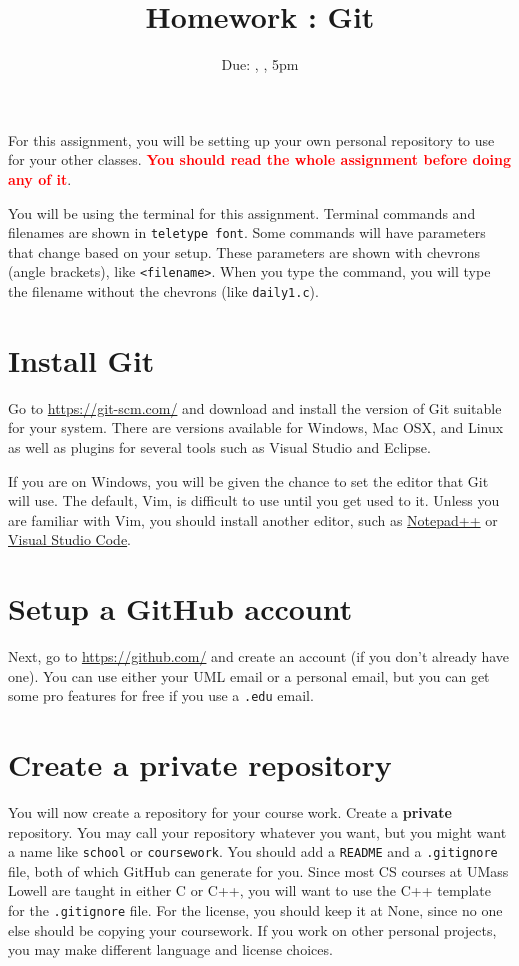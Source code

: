 \documentclass[12pt]{article}
\title{Homework \hwno: Git}
\date{Due: \dayofweekname{\duedate}{\duemonth}{\year}, \monthname[\duemonth] \duedate, 5pm}
\newcommand{\code}[1]{\texttt{#1}}
\begin{document}
\maketitle

For this assignment, you will be setting up your own personal repository to use for your other classes.  
\textcolor{red}{\textbf{You should read the whole assignment before doing any of it}}.

You will be using the terminal for this assignment.
Terminal commands and filenames are shown in \texttt{teletype font}.
Some commands will have parameters that change based on your setup.
These parameters are shown with chevrons (angle brackets), like \texttt{<filename>}.
When you type the command, you will type the filename without the chevrons (like \texttt{daily1.c}).

\section{Install Git}\label{sec:Install}

Go to \url{https://git-scm.com/} and download and install the version of Git suitable for your system.
There are versions available for Windows, Mac OSX, and Linux as well as plugins for several tools such as Visual Studio and Eclipse.

If you are on Windows, you will be given the chance to set the editor that Git will use.
The default, Vim, is difficult to use until you get used to it.
Unless you are familiar with Vim, you should install another editor, such as \href{https://notepad-plus-plus.org/}{Notepad++} or \href{https://code.visualstudio.com/}{Visual Studio Code}.

\section{Setup a GitHub account}
Next, go to \url{https://github.com/} and create an account (if you don't already have one).
You can use either your UML email or a personal email, but you can get some pro features for free if you use a \texttt{.edu} email.

\section{Create a private repository}

You will now create a repository for your course work.
Create a \textbf{private} repository.
You may call your repository whatever you want, but you might want a name like \code{school} or \code{coursework}.
You should add a \code{README} and a \code{.gitignore} file, both of which GitHub can generate for you.
Since most CS courses at UMass Lowell are taught in either C or C++, you will want to use the C++ template for the \code{.gitignore} file.
For the license, you should keep it at None, since no one else should be copying your coursework.
If you work on other personal projects, you may make different language and license choices.
\end{document}

